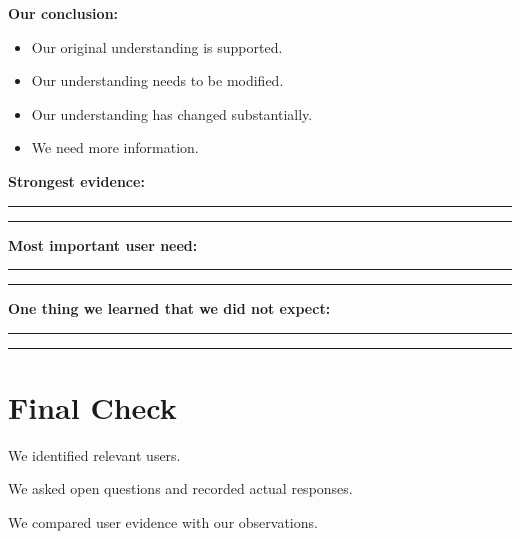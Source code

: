 \documentclass[12pt,a4paper]{article}
\newcommand{\checkbox}{\fbox{\rule{0pt}{0.8ex}\rule{0.8ex}{0pt}}}
\begin{document}
	\textbf{Our conclusion:}
	
	\begin{itemize}[leftmargin=0.6cm]
		\item \checkbox\quad Our original understanding is supported.
		\item \checkbox\quad Our understanding needs to be modified.
		\item \checkbox\quad Our understanding has changed substantially.
		\item \checkbox\quad We need more information.
	\end{itemize}
	
	\vspace{0.25cm}
	
	\textbf{Strongest evidence:}
	
	\noindent\rule{\linewidth}{0.4pt}
	
	\vspace{0.25cm}
	
	\noindent\rule{\linewidth}{0.4pt}
	
	\vspace{0.25cm}
	
	\textbf{Most important user need:}
	
	\noindent\rule{\linewidth}{0.4pt}
	
	\vspace{0.25cm}
	
	\noindent\rule{\linewidth}{0.4pt}
	
	\vspace{0.25cm}
	
	\textbf{One thing we learned that we did not expect:}
	
	\noindent\rule{\linewidth}{0.4pt}
	
	\vspace{0.25cm}
	
	\noindent\rule{\linewidth}{0.4pt}
	
	\vspace{-0.29cm}
	
	\section{Final Check}
	\noindent\checkbox\quad We identified relevant users.
	
	\noindent\checkbox\quad We asked open questions and recorded actual responses.
	
	\vspace{0.12cm}
	
	\noindent\checkbox\quad We compared user evidence with our observations.
	
\end{document}

